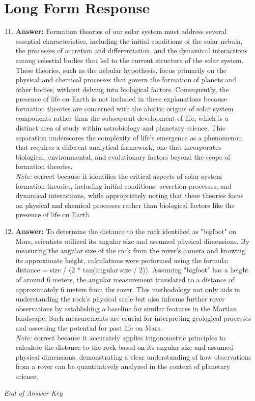 \documentclass[12pt]{article}
\begin{document}
\section*{Long Form Response}
\begin{enumerate}[label=\arabic*.]
\setcounter{enumi}{10}
\item \textbf{Answer:} Formation theories of our solar system must address several essential characteristics, including the initial conditions of the solar nebula, the processes of accretion and differentiation, and the dynamical interactions among celestial bodies that led to the current structure of the solar system. These theories, such as the nebular hypothesis, focus primarily on the physical and chemical processes that govern the formation of planets and other bodies, without delving into biological factors. Consequently, the presence of life on Earth is not included in these explanations because formation theories are concerned with the abiotic origins of solar system components rather than the subsequent development of life, which is a distinct area of study within astrobiology and planetary science. This separation underscores the complexity of life's emergence as a phenomenon that requires a different analytical framework, one that incorporates biological, environmental, and evolutionary factors beyond the scope of formation theories.
\\ \textit{Note:} correct because it identifies the critical aspects of solar system formation theories, including initial conditions, accretion processes, and dynamical interactions, while appropriately noting that these theories focus on physical and chemical processes rather than biological factors like the presence of life on Earth.
\item \textbf{Answer:} To determine the distance to the rock identified as "bigfoot" on Mars, scientists utilized its angular size and assumed physical dimensions. By measuring the angular size of the rock from the rover's camera and knowing its approximate height, calculations were performed using the formula: distance = size / (2 * tan(angular size / 2)). Assuming "bigfoot" has a height of around 6 meters, the angular measurement translated to a distance of approximately 6 meters from the rover. This methodology not only aids in understanding the rock's physical scale but also informs further rover observations by establishing a baseline for similar features in the Martian landscape. Such measurements are crucial for interpreting geological processes and assessing the potential for past life on Mars.
\\ \textit{Note:} correct because it accurately applies trigonometric principles to calculate the distance to the rock based on its angular size and assumed physical dimensions, demonstrating a clear understanding of how observations from a rover can be quantitatively analyzed in the context of planetary science.
\end{enumerate}

\vfill
\noindent\textit{End of Answer Key}
\end{document}
